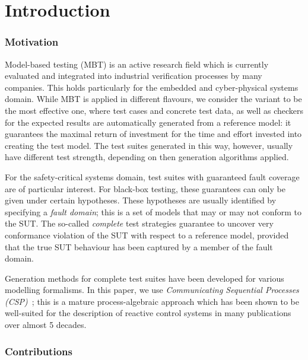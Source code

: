 \section{Introduction}
\label{sec:intro}


\subsubsection*{Motivation}

Model-based testing (MBT) is an  active research field which  is currently evaluated and integrated into industrial verification  
processes by many companies. This holds particularly for the embedded and cyber-physical systems domain. While MBT is applied in different flavours, we consider the variant 
to be the most effective one, 
where test cases and concrete test data, as well as checkers for the expected results
 are automatically generated from a reference model:
 it guarantees the maximal return of investment for the time and effort invested into creating the test model. The test suites generated in 
 this way, however, usually have different test strength, 
 depending on then generation algorithms applied.
 
For the safety-critical systems domain, test suites with guaranteed fault coverage 
are of particular interest. For black-box testing, these guarantees can only be given 
under certain hypotheses. These hypotheses are usually identified by specifying a \emph{fault domain}; this is a set of models that may or may not conform to the SUT. 
The so-called \emph{complete} test strategies guarantee to uncover very conformance violation of the SUT with respect to a reference model, provided that the true SUT behaviour has been captured by a member of the fault domain. 

Generation methods for complete test suites have been developed for various modelling formalisms. In this paper, we use 
\emph{Communicating Sequential Processes (CSP)}~\cite{Hoare:1985:CSP:3921,Roscoe2010}; 
this is 
a mature process-algebraic approach  which has been shown to be well-suited for 
the description of reactive control systems in many publications over almost 5 decades.

\subsubsection*{Contributions}


